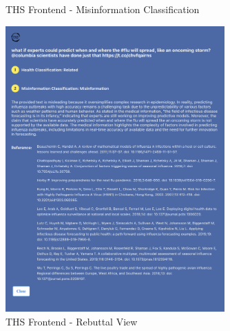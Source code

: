 \begin{figure}[H]
	\begin{center}
	\end{center}

	\caption{THS Frontend - Misinformation Classification } %
	\label{fig:frontendmisinformation}
\end{figure}


\begin{figure}[H]
	\begin{center}
		\includegraphics[width=0.75\textwidth]{images/THS_Rebuttal_view.png} %
	\end{center}
	\caption{THS Frontend  - Rebuttal View} %
	\label{fig:frontendrebuttal}
\end{figure}



